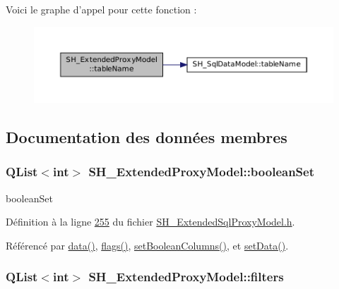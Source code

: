 Voici le graphe d'appel pour cette fonction \-:\nopagebreak
\begin{figure}[H]
\begin{center}
\leavevmode
\includegraphics[width=350pt]{classSH__ExtendedProxyModel_aba6e6f8bbde17ea533de3e9a127c804a_cgraph}
\end{center}
\end{figure}




\subsection{Documentation des données membres}
\hypertarget{classSH__ExtendedProxyModel_a7dd9cf1dd153b98220d217e9be1f0916}{
\subsubsection[{boolean\-Set}]{\setlength{\rightskip}{0pt plus 5cm}Q\-List$<$int$>$ S\-H\-\_\-\-Extended\-Proxy\-Model\-::boolean\-Set\hspace{0.3cm}{\ttfamily [private]}}}\label{classSH__ExtendedProxyModel_a7dd9cf1dd153b98220d217e9be1f0916}


boolean\-Set 



Définition à la ligne \hyperlink{SH__ExtendedSqlProxyModel_8h_source_l00255}{255} du fichier \hyperlink{SH__ExtendedSqlProxyModel_8h_source}{S\-H\-\_\-\-Extended\-Sql\-Proxy\-Model.\-h}.



Référencé par \hyperlink{classSH__ExtendedProxyModel_afbc947efbe1107fc5bf8926c52902a1c}{data()}, \hyperlink{classSH__ExtendedProxyModel_a0fed636838c17a8a027a3d1968e5bcf0}{flags()}, \hyperlink{classSH__ExtendedProxyModel_ac9836a6109137161ef67d5da25e699fe}{set\-Boolean\-Columns()}, et \hyperlink{classSH__ExtendedProxyModel_af92835fcefa1917f9cab64307f6b95b8}{set\-Data()}.

\hypertarget{classSH__ExtendedProxyModel_a99a5c4c6b9d125c87f048c76d22278d3}{
\subsubsection[{filters}]{\setlength{\rightskip}{0pt plus 5cm}Q\-List$<$int$>$ S\-H\-\_\-\-Extended\-Proxy\-Model\-::filters\hspace{0.3cm}{\ttfamily [private]}}}\label{classSH__ExtendedProxyModel_a99a5c4c6b9d125c87f048c76d22278d3}


